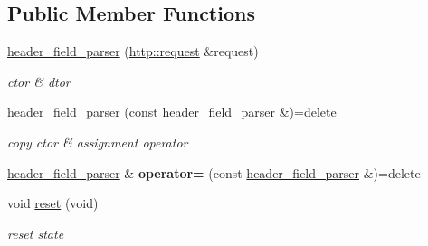 \subsection*{Public Member Functions}
\begin{DoxyCompactItemize}
\item 
\mbox{\label{classnetflex_1_1parsing_1_1header__field__parser_a619dc1b993b03073151e3793f2b91bb8}} 
\hyperlink{classnetflex_1_1parsing_1_1header__field__parser_a619dc1b993b03073151e3793f2b91bb8}{header\+\_\+field\+\_\+parser} (\hyperlink{classnetflex_1_1http_1_1request}{http\+::request} \&request)
\begin{DoxyCompactList}\small\item\em ctor \& dtor \end{DoxyCompactList}\item 
\mbox{\label{classnetflex_1_1parsing_1_1header__field__parser_ad98f22575070c9e2049fae7a39c8b195}} 
\hyperlink{classnetflex_1_1parsing_1_1header__field__parser_ad98f22575070c9e2049fae7a39c8b195}{header\+\_\+field\+\_\+parser} (const \hyperlink{classnetflex_1_1parsing_1_1header__field__parser}{header\+\_\+field\+\_\+parser} \&)=delete
\begin{DoxyCompactList}\small\item\em copy ctor \& assignment operator \end{DoxyCompactList}\item 
\mbox{\label{classnetflex_1_1parsing_1_1header__field__parser_ac34cdac6009d810413b3e7ba3df9dd96}} 
\hyperlink{classnetflex_1_1parsing_1_1header__field__parser}{header\+\_\+field\+\_\+parser} \& {\bfseries operator=} (const \hyperlink{classnetflex_1_1parsing_1_1header__field__parser}{header\+\_\+field\+\_\+parser} \&)=delete
\item 
\mbox{\label{classnetflex_1_1parsing_1_1header__field__parser_a8c77c07cd5ec5c4f4c5961359b648768}} 
void \hyperlink{classnetflex_1_1parsing_1_1header__field__parser_a8c77c07cd5ec5c4f4c5961359b648768}{reset} (void)
\begin{DoxyCompactList}\small\item\em reset state \end{DoxyCompactList}\item 

\end{DoxyCompactItemize}
